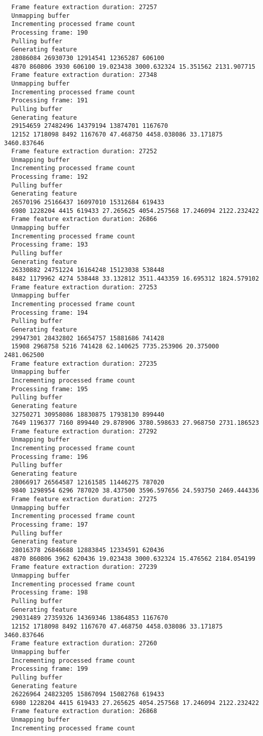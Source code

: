 \documentclass[12pt,oneside]{book}
\begin{document}
\begin{lstlisting}
  Frame feature extraction duration: 27257
  Unmapping buffer
  Incrementing processed frame count
  Processing frame: 190
  Pulling buffer
  Generating feature
  28086084 26930730 12914541 12365287 606100
  4870 860806 3930 606100 19.023438 3000.632324 15.351562 2131.907715
  Frame feature extraction duration: 27348
  Unmapping buffer
  Incrementing processed frame count
  Processing frame: 191
  Pulling buffer
  Generating feature
  29154659 27482496 14379194 13874701 1167670
  12152 1718098 8492 1167670 47.468750 4458.038086 33.171875 3460.837646
  Frame feature extraction duration: 27252
  Unmapping buffer
  Incrementing processed frame count
  Processing frame: 192
  Pulling buffer
  Generating feature
  26570196 25166437 16097010 15312684 619433
  6980 1228204 4415 619433 27.265625 4054.257568 17.246094 2122.232422
  Frame feature extraction duration: 26866
  Unmapping buffer
  Incrementing processed frame count
  Processing frame: 193
  Pulling buffer
  Generating feature
  26330882 24751224 16164248 15123038 538448
  8482 1179962 4274 538448 33.132812 3511.443359 16.695312 1824.579102
  Frame feature extraction duration: 27253
  Unmapping buffer
  Incrementing processed frame count
  Processing frame: 194
  Pulling buffer
  Generating feature
  29947301 28432802 16654757 15881686 741428
  15908 2968758 5216 741428 62.140625 7735.253906 20.375000 2481.062500
  Frame feature extraction duration: 27235
  Unmapping buffer
  Incrementing processed frame count
  Processing frame: 195
  Pulling buffer
  Generating feature
  32750271 30958086 18830875 17938130 899440
  7649 1196377 7160 899440 29.878906 3780.598633 27.968750 2731.186523
  Frame feature extraction duration: 27292
  Unmapping buffer
  Incrementing processed frame count
  Processing frame: 196
  Pulling buffer
  Generating feature
  28066917 26564587 12161585 11446275 787020
  9840 1298954 6296 787020 38.437500 3596.597656 24.593750 2469.444336
  Frame feature extraction duration: 27275
  Unmapping buffer
  Incrementing processed frame count
  Processing frame: 197
  Pulling buffer
  Generating feature
  28016378 26846688 12883845 12334591 620436
  4870 860806 3962 620436 19.023438 3000.632324 15.476562 2184.054199
  Frame feature extraction duration: 27239
  Unmapping buffer
  Incrementing processed frame count
  Processing frame: 198
  Pulling buffer
  Generating feature
  29031489 27359326 14369346 13864853 1167670
  12152 1718098 8492 1167670 47.468750 4458.038086 33.171875 3460.837646
  Frame feature extraction duration: 27260
  Unmapping buffer
  Incrementing processed frame count
  Processing frame: 199
  Pulling buffer
  Generating feature
  26226964 24823205 15867094 15082768 619433
  6980 1228204 4415 619433 27.265625 4054.257568 17.246094 2122.232422
  Frame feature extraction duration: 26868
  Unmapping buffer
  Incrementing processed frame count
\end{lstlisting}
\end{document}
